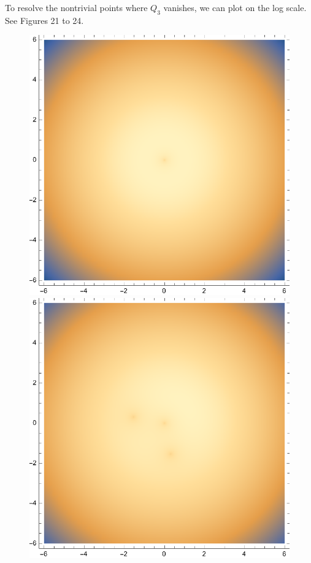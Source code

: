 \documentclass{article}
\theoremstyle{definition}
\begin{document}
\begin{enumerate}[label=\alph*)]
	To resolve the nontrivial points where $Q_3$ vanishes, we can plot on the log scale. See Figures 21 to 24. 		
	\begin{figure}[!htb]
	\centering
	\begin{minipage}{.24\textwidth}
  	\centering
  	\includegraphics[width=.7\linewidth]{figures/3-N-1-log.eps}
	\end{minipage}%
	\begin{minipage}{.24\textwidth}
  	\centering
  	\includegraphics[width=.7\linewidth]{figures/3-N-3-log.eps}
	\end{minipage}
	\begin{minipage}{.24\textwidth}
  	\centering

\end{minipage}
\end{figure}
\end{enumerate}
\end{document}

